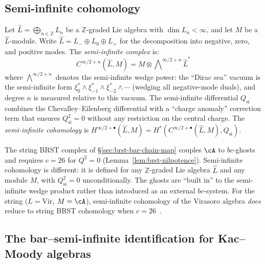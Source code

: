\subsection{Semi-infinite cohomology}

\begin{definition}
\label{def:semi-infinite-cohomology}
Let $\widehat{L} = \bigoplus_{n \in \mathbb{Z}} L_n$ be a
$\mathbb{Z}$-graded Lie algebra with $\dim L_n < \infty$, and let
$M$ be a $\widehat{L}$-module. Write
$\widehat{L} = L_- \oplus L_0 \oplus L_+$ for the decomposition
into negative, zero, and positive modes. The \emph{semi-infinite
complex} is:
\[
C^{\infty/2+n}(\widehat{L}, M)
= M \otimes \textstyle\bigwedge\nolimits^{\infty/2+n}\! \widehat{L}^*
\]
where $\bigwedge^{\infty/2+n}$ denotes the semi-infinite wedge
power: the ``Dirac sea'' vacuum is the semi-infinite form
$\xi_0^* \wedge \xi_{-1}^* \wedge \xi_{-2}^* \wedge \cdots$
(wedging all negative-mode duals), and degree $n$ is measured
relative to this vacuum. The semi-infinite differential
$Q_{\mathrm{si}}$ combines the Chevalley--Eilenberg differential
with a ``charge anomaly'' correction term that ensures
$Q_{\mathrm{si}}^2 = 0$ without any restriction on the central charge.
The \emph{semi-infinite cohomology} is
$H^{\infty/2+\bullet}(\widehat{L}, M) =
H^*(C^{\infty/2+\bullet}(\widehat{L}, M), Q_{\mathrm{si}})$.
\end{definition}

\begin{remark}
\label{rem:semi-infinite-vs-brst}
The string BRST complex of \S\ref{sec:brst-bar-chain-map} couples
$\cA$ to $bc$-ghosts and requires $c = 26$ for $Q^2 = 0$
(Lemma~\ref{lem:brst-nilpotence}). Semi-infinite cohomology is
different: it is defined for any $\mathbb{Z}$-graded Lie algebra
$\widehat{L}$ and any module $M$, with $Q_{\mathrm{si}}^2 = 0$
unconditionally. The ghosts are ``built in'' to the semi-infinite
wedge product rather than introduced as an external $bc$-system.
For the string ($\widehat{L} = \mathrm{Vir}$, $M = \cA$),
semi-infinite cohomology of the Virasoro algebra \emph{does}
reduce to string BRST cohomology when $c = 26$~\cite{FGZ86}.
\end{remark}

\subsection{The bar--semi-infinite identification for Kac--Moody algebras}

